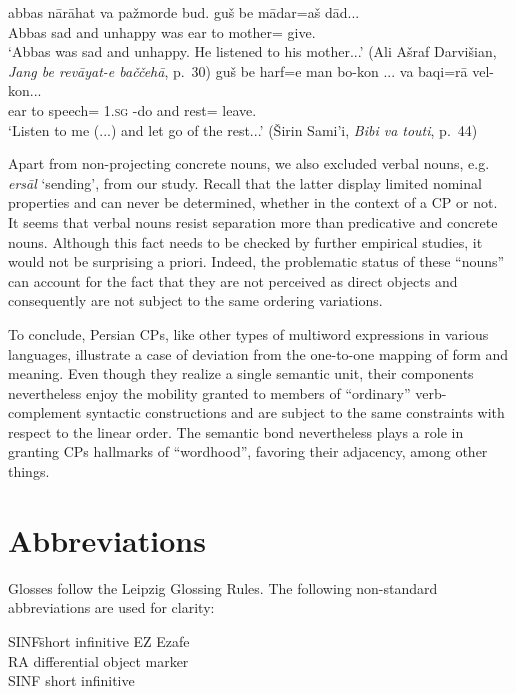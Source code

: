 \documentclass[output=paper]{langsci/langscibook}
\begin{document}
\begin{exe}
	\ex
	\gll abbas n\=ar\=ahat va pa\v{z}morde bud. gu\v{s} be m\=adar=a\v{s} d\=ad...\\
	Abbas sad and unhappy was ear to mother= give.\\
	\glt`Abbas was sad and unhappy. He listened to his mother...' 	\hfill (Ali A\v{s}raf Darvi\v{s}ian, \textit{Jang be rev\=ayat-e ba\v{c}\v{c}eh\=a}, p.~30) 
	\ex
	\gll gu\v{s} be harf=e man bo-kon ... va baqi=r\=a vel-kon...\\
	ear to speech= \textsc{1.sg} -do {} and rest= leave.\\
	\glt`Listen to me (...) and let go of the rest...' 	\hfill (\v{S}irin Sami'i, \textit{Bibi va touti}, p.~44) 
\end{exe}

Apart from non-projecting concrete nouns, we also excluded verbal
nouns, e.g. \textit{ers\=al} `sending', from our study. Recall that the
latter display limited nominal properties and can never be determined,
whether in the context of a CP or not. It seems that verbal nouns resist separation more than predicative and concrete nouns. Although this fact
needs to be checked by further empirical studies, it would not be
surprising a priori. Indeed, the problematic status of these ``nouns''
can account for the fact that they are not perceived as direct objects
and consequently are not subject to the same ordering variations.

To conclude, Persian CPs, like other types of multiword expressions in
various languages, illustrate a case of deviation from the one-to-one
mapping of form and meaning. Even though they realize a
single semantic unit, their components nevertheless enjoy the mobility
granted to members of ``ordinary'' verb-complement syntactic
constructions and are subject to the same constraints with respect to the
linear order. The semantic bond nevertheless plays a role in granting
CPs hallmarks of ``wordhood'', favoring their adjacency, among other
things.

\section*{Abbreviations}
Glosses follow the Leipzig Glossing Rules. The following non-standard abbreviations are used for clarity:  

\begin{tabbing}
SINF\quad\= short infinitive\kill
EZ   \> Ezafe\\
RA   \> differential object marker\\
SINF \> short infinitive
\end{tabbing}
\end{document}

